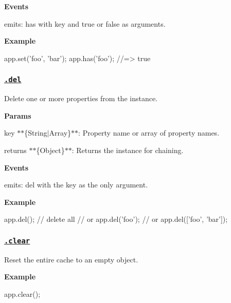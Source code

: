{\bfseries Events}


\begin{DoxyItemize}
\item {\ttfamily emits}\+: {\ttfamily has} with {\ttfamily key} and true or false as arguments.
\end{DoxyItemize}

{\bfseries Example}


\begin{DoxyCode}
app.set('foo', 'bar');
app.has('foo');
//=> true
\end{DoxyCode}


\subsubsection*{\href{index.js#L199}{\tt .del}}

Delete one or more properties from the instance.

{\bfseries Params}


\begin{DoxyItemize}
\item {\ttfamily key} $\ast$$\ast$\{String$\vert$\+Array\}$\ast$$\ast$\+: Property name or array of property names.
\item {\ttfamily returns} $\ast$$\ast$\{Object\}$\ast$$\ast$\+: Returns the instance for chaining.
\end{DoxyItemize}

{\bfseries Events}


\begin{DoxyItemize}
\item {\ttfamily emits}\+: {\ttfamily del} with the {\ttfamily key} as the only argument.
\end{DoxyItemize}

{\bfseries Example}


\begin{DoxyCode}
app.del(); // delete all
// or
app.del('foo');
// or
app.del(['foo', 'bar']);
\end{DoxyCode}


\subsubsection*{\href{index.js#L218}{\tt .clear}}

Reset the entire cache to an empty object.

{\bfseries Example}


\begin{DoxyCode}
app.clear();
\end{DoxyCode}


